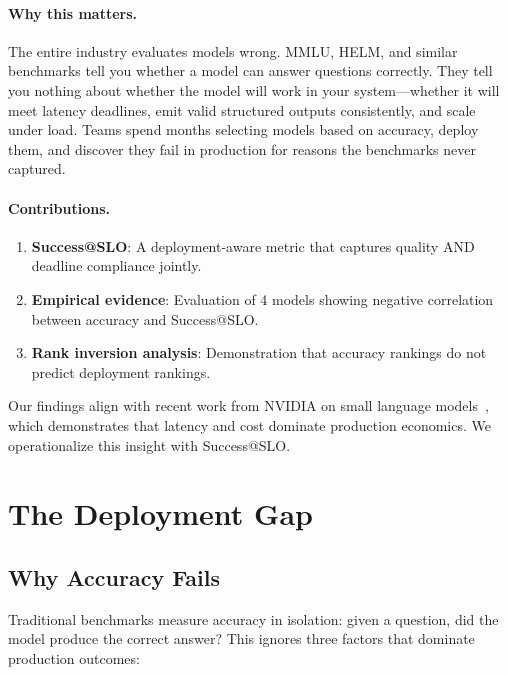 \documentclass[11pt]{article}
\begin{document}
\paragraph{Why this matters.}
The entire industry evaluates models wrong.
MMLU, HELM, and similar benchmarks tell you whether a model can answer questions correctly.
They tell you nothing about whether the model will work in your system---whether it will meet latency deadlines, emit valid structured outputs consistently, and scale under load.
Teams spend months selecting models based on accuracy, deploy them, and discover they fail in production for reasons the benchmarks never captured.

\paragraph{Contributions.}
\begin{enumerate}[leftmargin=12pt]
    \item \textbf{Success@SLO}: A deployment-aware metric that captures quality AND deadline compliance jointly.
    \item \textbf{Empirical evidence}: Evaluation of 4 models showing negative correlation between accuracy and Success@SLO.
    \item \textbf{Rank inversion analysis}: Demonstration that accuracy rankings do not predict deployment rankings.
\end{enumerate}

Our findings align with recent work from NVIDIA on small language models~\cite{nvidia2025slm}, which demonstrates that latency and cost dominate production economics.
We operationalize this insight with Success@SLO.

\section{The Deployment Gap}

\subsection{Why Accuracy Fails}

Traditional benchmarks measure accuracy in isolation: given a question, did the model produce the correct answer?
This ignores three factors that dominate production outcomes:
\end{document}
